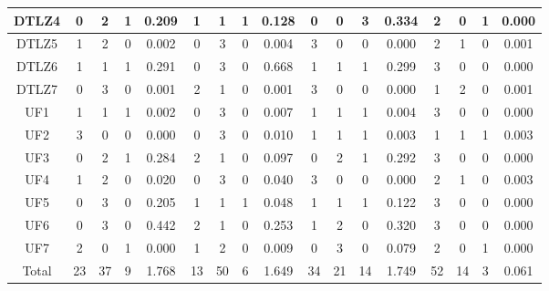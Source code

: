 \begin{table*}[t]
\begin{tabular}{c|c|c|c|c|c|c|c|c|c|c|c|c|c|c|c|c|}
\multicolumn{1}{|c|}{DTLZ4} & 0 & 2 & 1 & 0.209 & 1 & 1 & 1 & 0.128 & 0 & 0 & 3 & 0.334 & 2 & 0 & 1 & 0.000 \\ \hline
\multicolumn{1}{|c|}{DTLZ5} & 1 & 2 & 0 & 0.002 & 0 & 3 & 0 & 0.004 & 3 & 0 & 0 & 0.000 & 2 & 1 & 0 & 0.001 \\ \hline
\multicolumn{1}{|c|}{DTLZ6} & 1 & 1 & 1 & 0.291 & 0 & 3 & 0 & 0.668 & 1 & 1 & 1 & 0.299 & 3 & 0 & 0 & 0.000 \\ \hline
\multicolumn{1}{|c|}{DTLZ7} & 0 & 3 & 0 & 0.001 & 2 & 1 & 0 & 0.001 & 3 & 0 & 0 & 0.000 & 1 & 2 & 0 & 0.001 \\ \hline
\multicolumn{1}{|c|}{UF1} & 1 & 1 & 1 & 0.002 & 0 & 3 & 0 & 0.007 & 1 & 1 & 1 & 0.004 & 3 & 0 & 0 & 0.000 \\ \hline
\multicolumn{1}{|c|}{UF2} & 3 & 0 & 0 & 0.000 & 0 & 3 & 0 & 0.010 & 1 & 1 & 1 & 0.003 & 1 & 1 & 1 & 0.003 \\ \hline
\multicolumn{1}{|c|}{UF3} & 0 & 2 & 1 & 0.284 & 2 & 1 & 0 & 0.097 & 0 & 2 & 1 & 0.292 & 3 & 0 & 0 & 0.000 \\ \hline
\multicolumn{1}{|c|}{UF4} & 1 & 2 & 0 & 0.020 & 0 & 3 & 0 & 0.040 & 3 & 0 & 0 & 0.000 & 2 & 1 & 0 & 0.003 \\ \hline
\multicolumn{1}{|c|}{UF5} & 0 & 3 & 0 & 0.205 & 1 & 1 & 1 & 0.048 & 1 & 1 & 1 & 0.122 & 3 & 0 & 0 & 0.000 \\ \hline
\multicolumn{1}{|c|}{UF6} & 0 & 3 & 0 & 0.442 & 2 & 1 & 0 & 0.253 & 1 & 2 & 0 & 0.320 & 3 & 0 & 0 & 0.000 \\ \hline
\multicolumn{1}{|c|}{UF7} & 2 & 0 & 1 & 0.000 & 1 & 2 & 0 & 0.009 & 0 & 3 & 0 & 0.079 & 2 & 0 & 1 & 0.000 \\ \hline
\multicolumn{1}{|c|}{Total} & 23 & 37 & 9 & 1.768 & 13 & 50 & 6 & 1.649 & 34 & 21 & 14 & 1.749 & 52 & 14 & 3 & 0.061 \\ \hline
\end{tabular}%
\end{table*}

